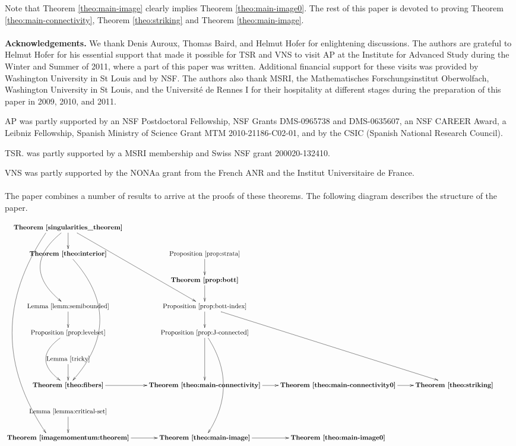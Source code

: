 \documentclass[11pt]{article}
\begin{document}
Note that Theorem \ref{theo:main-image} clearly implies Theorem
\ref{theo:main-image0}. The rest of this paper is devoted to proving
Theorem \ref{theo:main-connectivity}, Theorem \ref{theo:striking} and
Theorem \ref{theo:main-image}.
\\
\\
{\bf Acknowledgements.} We thank Denis Auroux, Thomas Baird, and
Helmut Hofer for enlightening discussions. The authors are grateful to
Helmut Hofer for his essential support that made it possible for TSR
and VNS to visit AP at the Institute for Advanced Study during the
Winter and Summer of 2011, where a part of this paper was
written. Additional financial support for these visits was provided by
Washington University in St Louis and by NSF.  The authors also thank
MSRI, the Mathematisches Forschungsinstitut Oberwolfach, Washington
University in St Louis, and the Universit\'e de Rennes I for their
hospitality at different stages during the preparation of this paper
in 2009, 2010, and 2011.

AP was partly supported by an NSF Postdoctoral Fellowship, NSF Grants
DMS-0965738 and DMS-0635607, an NSF CAREER Award, a Leibniz Fellowship,
Spanish Ministry of Science Grant MTM 2010-21186-C02-01, 
and by the CSIC (Spanish National Research Council).

TSR. was partly supported by a MSRI membership and Swiss NSF grant
200020-132410.

VNS was partly supported by the NONAa grant from the French ANR and
the Institut Universitaire de France.
\\
\\
The paper combines a number of results
to arrive at the proofs of these theorems. The following diagram
describes the structure of the paper.


$$
\xymatrix{ \text{\bf Theorem~\ref{singularities_theorem}} \ar @<-1cm>
  @/_2cm/ [dddddddd] \ar @/_1.5cm/ [ddd] \ar[d] \ar[rddd] &
  & & \\
%
  \text{\bf Theorem~\ref{theo:interior}} \ar @/^1.7cm/ [ddddd] &
  \text{Proposition~\ref{prop:strata}} \ar[d] & & \\
%
  &
  \text{\bf Theorem~\ref{prop:bott}} \ar[d] & & & \\
%
  \text{Lemma~\ref{lemm:semibounded}} \ar[d] &
  \text{Proposition~\ref{prop:bott-index}} \ar[d] \ar[dddrr]& & \\
%
  \text{Proposition~\ref{prop:levelset}} \ar @/_1.2cm/ [dd] &
  \text{Proposition~\ref{prop:J-connected}} \ar[dd] \ar @/^1cm/
  [dddd]& & \\
%
  \text{Lemma~\ref{tricky}} \ar[d] & & & \\
%
  \text{\bf Theorem~\ref{theo:fibers}} \ar[r]& \text{\bf
    Theorem~\ref{theo:main-connectivity}} \ar[r] & \text{\bf
    Theorem~\ref{theo:main-connectivity0}} \ar[r] & \text{\bf Theorem~\ref{theo:striking}}\\
%
  \text{Lemma~\ref{lemma:critical-set}} \ar[d] & & & \\
%
  \text{\bf Theorem~\ref{imagemomentum:theorem}} \ar[r] & \text{\bf
    Theorem~\ref{theo:main-image}} \ar[r] & \text{\bf
    Theorem~\ref{theo:main-image0}} }
$$
\end{document}
